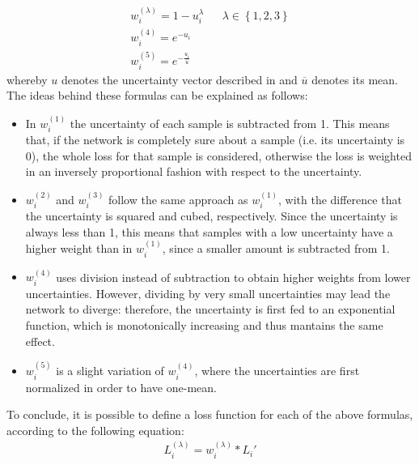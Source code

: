 \documentclass[11pt,twoside,a4paper]{article}
\begin{document}
\begin{equation*}
\begin{aligned}
w_{i}^{(\lambda )} = 1-u_{i}^{\lambda} && \textstyle \lambda \in \left \{ 1, 2, 3 \right \} \\
w_{i}^{(4)} = e^{-u_{i}} \\
w_{i}^{(5)} = e^{-\frac{u_{i}}{\overline{u}}}
\end{aligned}
\end{equation*}
whereby \({u}\) denotes the uncertainty vector described in \cite{kwon2018uncertainty} and \(\overline{u}\) denotes its mean.\newline
The ideas behind these formulas can be explained as follows:
\begin{itemize}
\item In \(w_{i}^{(1)}\) the uncertainty of each sample is subtracted from 1. This means that, if the network is completely sure about a sample (i.e. its uncertainty is 0), the whole loss for that sample is considered, otherwise the loss is weighted in an inversely proportional fashion with respect to the uncertainty.
\item \(w_{i}^{(2)}\) and \(w_{i}^{(3)}\) follow the same approach as \(w_{i}^{(1)}\), with the difference that the uncertainty is squared and cubed, respectively. Since the uncertainty is always less than 1, this means that samples with a low uncertainty have a higher weight than in \(w_{i}^{(1)}\), since a smaller amount is subtracted from 1.
\item \(w_{i}^{(4)}\) uses division instead of subtraction to obtain higher weights from lower uncertainties. However, dividing by very small uncertainties may lead the network to diverge: therefore, the uncertainty is first fed to an exponential function, which is monotonically increasing and thus mantains the same effect.
\item \(w_{i}^{(5)}\) is a slight variation of \(w_{i}^{(4)}\), where the uncertainties are first normalized in order to have one-mean.
\end{itemize}

To conclude, it is possible to define a loss function for each of the above formulas, according to the following equation:
\begin{align}
L_{i}^{(\lambda)} = w_{i}^{(\lambda)} * {L_{i}}'
\end{align}
\end{document}
